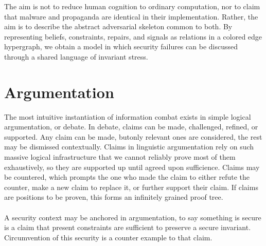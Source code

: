 \documentclass{article}
\begin{document}
	The aim is not to reduce human cognition to ordinary computation, nor to claim that malware and propaganda are identical in their implementation. Rather, the aim is to describe the abstract adversarial skeleton common to both. By representing beliefs, constraints, repairs, and signals as relations in a colored edge hypergraph, we obtain a model in which security failures can be discussed through a shared language of invariant stress.
	\section{Argumentation}
	The most intuitive instantiation of information combat exists in simple logical argumentation, or debate. In debate, claims can be made, challenged, refined, or supported. Any claim can be made, butonly relevant ones are considered, the rest may be dismissed contextually. Claims in linguistic argumentation rely on such massive logical infrastructure that we cannot reliably prove most of them exhaustively, so they are supported up until agreed upon sufficience. Claims may be countered, which prompts the one who made the claim to either refute the counter, make a new claim to replace it, or further support their claim. If claims are positions to be proven, this forms an infinitely grained proof tree.\\\\
	A security context may be anchored in argumentation, to say something is secure is a claim that present constraints are sufficient to preserve a secure invariant. Circumvention of this security is a counter example to that claim.
\end{document}
